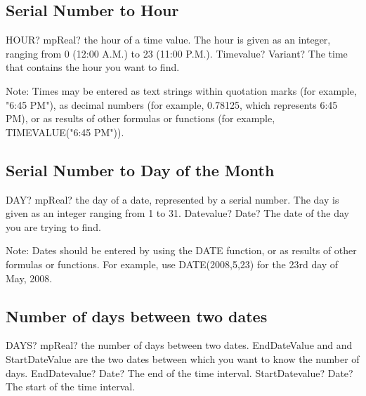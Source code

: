 \subsection{Serial Number to Hour}

\begin{mpFunctionsExtract}
	\mpWorksheetFunctionOneNotImplemented
	{HOUR? mpReal? the hour of a time value. The hour is given as an integer, ranging from 0 (12:00 A.M.) to 23 (11:00 P.M.).}
	{Timevalue? Variant? The time that contains the hour you want to find.}
\end{mpFunctionsExtract}

\vspace{0.3cm}
Note: Times may be entered as text strings within quotation marks (for example, "6:45 PM"), as decimal numbers (for example, 0.78125, which represents 6:45 PM), or as results of other formulas or functions (for example, TIMEVALUE("6:45 PM")).



\subsection{Serial Number to Day of the Month}

\begin{mpFunctionsExtract}
	\mpWorksheetFunctionOneNotImplemented
	{DAY? mpReal? the day of a date, represented by a serial number. The day is given as an integer ranging from 1 to 31.}
	{Datevalue? Date? The date of the day you are trying to find.}
\end{mpFunctionsExtract}

\vspace{0.3cm}
Note: Dates should be entered by using the DATE function, or as results of other formulas or functions. For example, use DATE(2008,5,23) for the 23rd day of May, 2008. 




\subsection{Number of days between two dates}

\begin{mpFunctionsExtract}
	\mpWorksheetFunctionTwoNotImplemented
	{DAYS? mpReal? the number of days between two dates. EndDateValue and  and StartDateValue  are the two dates between which you want to know the number of days.}
	{EndDatevalue? Date? The end of the time interval.}
	{StartDatevalue? Date? The start of the time interval.}
\end{mpFunctionsExtract}




